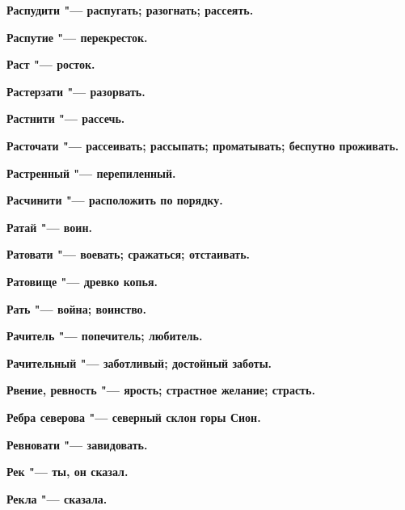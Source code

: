 \begin{multicols}{2}
\bfseries Распудити\normalfont{} "--- распугать; разогнать; рассеять. 




\bfseries Распутие\normalfont{} "--- перекресток. 




\bfseries Раст\normalfont{} "--- росток. 




\bfseries Растерзати\normalfont{} "--- разорвать. 




\bfseries Растнити\normalfont{} "--- рассечь. 




\bfseries Расточати\normalfont{} "--- рассеивать; рассыпать; проматывать; беспутно проживать. 




\bfseries Растренный\normalfont{} "--- перепиленный. 




\bfseries Расчинити\normalfont{} "--- расположить по порядку. 




\bfseries Ратай\normalfont{} "--- воин. 




\bfseries Ратовати\normalfont{} "--- воевать; сражаться; отстаивать. 




\bfseries Ратовище\normalfont{} "--- древко копья. 




\bfseries Рать\normalfont{} "--- война; воинство. 




\bfseries Рачитель\normalfont{} "--- попечитель; любитель. 




\bfseries Рачительный\normalfont{} "--- заботливый; достойный заботы. 




\bfseries Рвение, ревность\normalfont{} "--- ярость; страстное желание; страсть. 




\bfseries Ребра северова\normalfont{} "--- северный склон горы Сион. 




\bfseries Ревновати\normalfont{} "--- завидовать. 




\bfseries Рек\normalfont{} "--- ты, он сказал. 




\bfseries Рекла\normalfont{} "--- сказала. 





\end{multicols}
